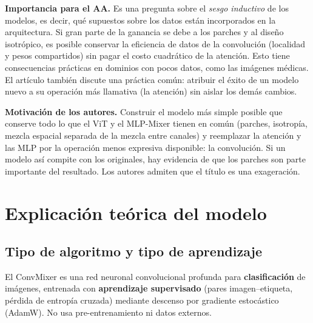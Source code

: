 \documentclass[11pt,a4paper]{article}
\begin{document}
\textbf{Importancia para el AA.} Es una pregunta sobre el \emph{sesgo inductivo} de los modelos, es decir, qué
supuestos sobre los datos están incorporados en la arquitectura. Si gran parte de la ganancia se debe a los parches
y al diseño isotrópico, es posible conservar la eficiencia de datos de la convolución (localidad y pesos
compartidos) sin pagar el costo cuadrático de la atención. Esto tiene consecuencias prácticas en dominios con
pocos datos, como las imágenes médicas. El artículo también discute una práctica común: atribuir el éxito de un
modelo nuevo a su operación más llamativa (la atención) sin aislar los demás cambios.

\textbf{Motivación de los autores.} Construir el modelo más simple posible que conserve todo lo que el ViT y el
MLP-Mixer tienen en común (parches, isotropía, mezcla espacial separada de la mezcla entre canales) y reemplazar la
atención y las MLP por la operación menos expresiva disponible: la convolución. Si un modelo así compite con los
originales, hay evidencia de que los parches son parte importante del resultado. Los autores admiten que el título
es una exageración.

\section{Explicación teórica del modelo}
\subsection{Tipo de algoritmo y tipo de aprendizaje}
El ConvMixer es una red neuronal convolucional profunda para \textbf{clasificación} de imágenes, entrenada con
\textbf{aprendizaje supervisado} (pares imagen--etiqueta, pérdida de entropía cruzada) mediante descenso por gradiente
estocástico (AdamW). No usa pre-entrenamiento ni datos externos.
\end{document}

